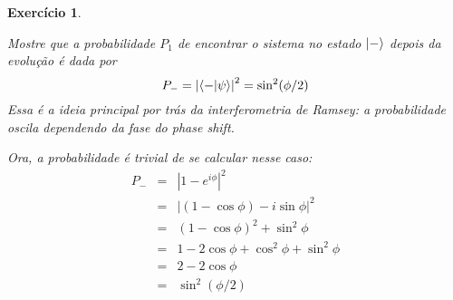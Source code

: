 \documentclass[12pt]{article}
\def\be{\begin{equation}}
\def\ee{\end{equation}}
\def\bea{\begin{eqnarray*}}
\def\eea{\end{eqnarray*}}
\def\l{\left}
\def\r{\right}
\newtheorem{exercise}{Exercício}
\begin{document}
\begin{exercise}
\begin{exercises}
			\item Mostre que a probabilidade $P_1$ de encontrar o sistema no estado $\ket{-}$ depois da evolução é dada por
			\be
				P_- = \l| \braket{- | \psi} \r|^2 = \sin^2(\phi/2)
			\ee
			Essa é a ideia principal por trás da interferometria de Ramsey: a probabilidade
			oscila dependendo da fase do phase shift.
			\begin{multianswer}[true]
				Ora, a probabilidade é trivial de se calcular nesse caso:
				\bea
					P_- &=& \l| 1-e^{i\phi} \r|^2 \\
						&=& \l| (1-\cos\phi) -i\sin\phi \r|^2 \\
						&=& (1-\cos\phi)^2 + \sin^2\phi \\
						&=& 1 - 2\cos\phi + \cos^2\phi + \sin^2\phi \\
						&=& 2 - 2\cos\phi \\
						&=& \sin^2(\phi/2)
				\eea
			\end{multianswer}
		\end{exercises}		
	\end{exercise}
	
\end{document}
